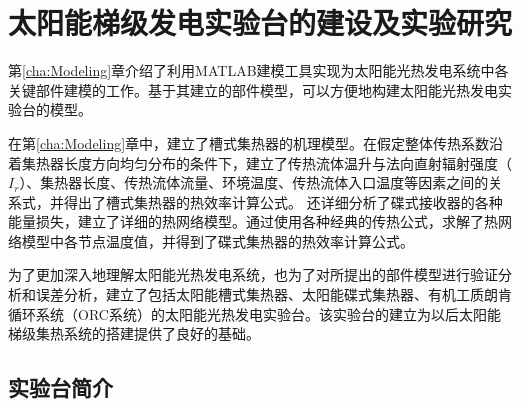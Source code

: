 \chapter{太阳能梯级发电实验台的建设及实验研究}

第\ref{cha:Modeling}章介绍了利用MATLAB建模工具实现为太阳能光热发电系统中各关键部件建模的工作。基于其建立的部件模型，可以方便地构建太阳能光热发电实验台的模型。

在第\ref{cha:Modeling}章中，建立了槽式集热器的机理模型。在假定整体传热系数沿着集热器长度方向均匀分布的条件下，建立了传热流体温升与法向直射辐射强度（$I_r$）、集热器长度、传热流体流量、环境温度、传热流体入口温度等因素之间的关系式，并得出了槽式集热器的热效率计算公式。
还详细分析了碟式接收器的各种能量损失，建立了详细的热网络模型。通过使用各种经典的传热公式，求解了热网络模型中各节点温度值，并得到了碟式集热器的热效率计算公式。

为了更加深入地理解太阳能光热发电系统，也为了对所提出的部件模型进行验证分析和误差分析，建立了包括太阳能槽式集热器、太阳能碟式集热器、有机工质朗肯循环系统（ORC系统）的太阳能光热发电实验台。该实验台的建立为以后太阳能梯级集热系统的搭建提供了良好的基础。

\section{实验台简介}

